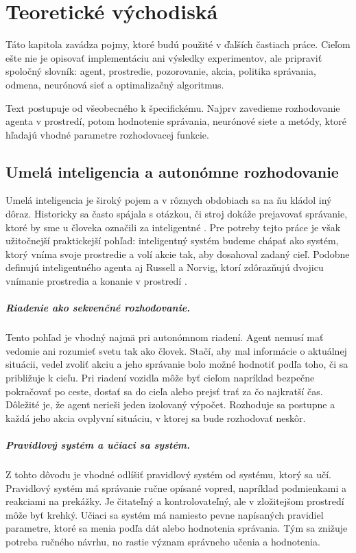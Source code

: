 \chapter{Teoretické východiská}

Táto kapitola zavádza pojmy, ktoré budú použité v ďalších častiach práce. Cieľom ešte nie je opisovať implementáciu ani výsledky experimentov, ale pripraviť spoločný slovník: agent, prostredie, pozorovanie, akcia, politika správania, odmena, neurónová sieť a optimalizačný algoritmus.

Text postupuje od všeobecného k špecifickému. Najprv zavedieme rozhodovanie agenta v prostredí, potom hodnotenie správania, neurónové siete a metódy, ktoré hľadajú vhodné parametre rozhodovacej funkcie.

\section{Umelá inteligencia a autonómne rozhodovanie}

Umelá inteligencia je široký pojem a v rôznych obdobiach sa na ňu kládol iný dôraz. Historicky sa často spájala s otázkou, či stroj dokáže prejavovať správanie, ktoré by sme u človeka označili za inteligentné \cite{turing1950computing}. Pre potreby tejto práce je však užitočnejší praktickejší pohľad: inteligentný systém budeme chápať ako systém, ktorý vníma svoje prostredie a volí akcie tak, aby dosahoval zadaný cieľ. Podobne definujú inteligentného agenta aj Russell a Norvig, ktorí zdôrazňujú dvojicu vnímanie prostredia a konanie v prostredí \cite{russell_norvig_aima2021}.

\paragraph{Riadenie ako sekvenčné rozhodovanie.}
Tento pohľad je vhodný najmä pri autonómnom riadení. Agent nemusí mať vedomie ani rozumieť svetu tak ako človek. Stačí, aby mal informácie o aktuálnej situácii, vedel zvoliť akciu a jeho správanie bolo možné hodnotiť podľa toho, či sa približuje k cieľu. Pri riadení vozidla môže byť cieľom napríklad bezpečne pokračovať po ceste, dostať sa do cieľa alebo prejsť trať za čo najkratší čas. Dôležité je, že agent nerieši jeden izolovaný výpočet. Rozhoduje sa postupne a každá jeho akcia ovplyvní situáciu, v ktorej sa bude rozhodovať neskôr.

\paragraph{Pravidlový systém a učiaci sa systém.}
Z tohto dôvodu je vhodné odlíšiť pravidlový systém od systému, ktorý sa učí. Pravidlový systém má správanie ručne opísané vopred, napríklad podmienkami a reakciami na prekážky. Je čitateľný a kontrolovateľný, ale v zložitejšom prostredí môže byť krehký. Učiaci sa systém má namiesto pevne napísaných pravidiel parametre, ktoré sa menia podľa dát alebo hodnotenia správania. Tým sa znižuje potreba ručného návrhu, no rastie význam správneho učenia a hodnotenia.

